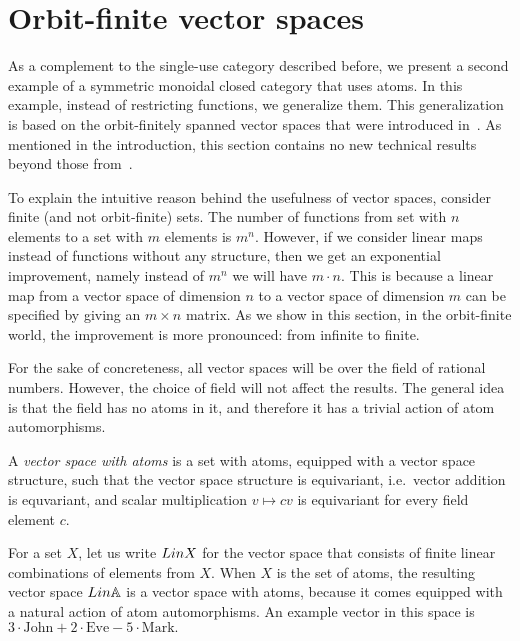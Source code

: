 \section{Orbit-finite vector spaces}
As a complement to the single-use category described before, we present a second example of a symmetric monoidal closed category that  uses atoms. In this example, instead of restricting functions, we generalize them. This generalization is based on the  orbit-finitely spanned vector spaces that were introduced in~\cite{bojanczykKM21OrbitFiniteVector}. As mentioned in the introduction,  this section contains no new technical results beyond those from~\cite{bojanczykKM21OrbitFiniteVector}. 

To explain the intuitive reason behind the usefulness of vector spaces, consider finite (and not orbit-finite) sets. The number of functions from set with $n$ elements to a set with $m$ elements is $m^n$. However, if we consider linear maps instead of functions without any structure, then we get an exponential improvement, namely instead of $m^n$ we will have $m \cdot n$. 
This is because a linear map from a vector space of dimension $n$ to a vector space of dimension $m$ can be specified by giving an $m \times n$ matrix. As we show in this section,  in the orbit-finite world, the improvement is more pronounced: from infinite to finite.

For the sake of concreteness, all  vector spaces will be over the field of rational numbers. However, the choice of field will not affect the results. The general idea is that the field has no atoms in it, and therefore it has a trivial action of atom automorphisms. 
\begin{definition}
    A \emph{vector space with atoms} is a set with atoms, equipped with a vector space structure, such that the vector space structure is equivariant, i.e.~vector addition is equvariant, and  scalar multiplication $v \mapsto cv$ is equivariant for every field element $c$.
\end{definition}


\begin{example} \label{ex:lina} For a set $X$, let us write $\Lin X$ for the vector space that consists of finite linear combinations of elements from $X$. When $X$ is the set of atoms, the resulting vector space $\Lin \atoms$ is a vector space with atoms, because it comes equipped with a natural action of atom automorphisms.  An example vector in this space is $
3 \cdot \text{John} + 2 \cdot \text{Eve} - 5 \cdot \text{Mark}.
$ \exampleend
\end{example}

